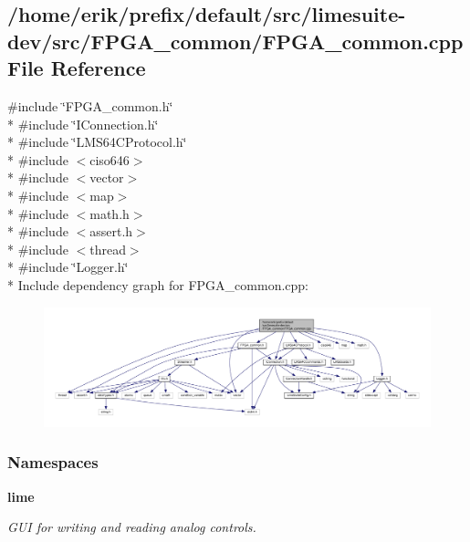 \subsection{/home/erik/prefix/default/src/limesuite-\/dev/src/\+F\+P\+G\+A\+\_\+common/\+F\+P\+G\+A\+\_\+common.cpp File Reference}
\label{FPGA__common_8cpp}
{\ttfamily \#include \char`\"{}F\+P\+G\+A\+\_\+common.\+h\char`\"{}}\\*
{\ttfamily \#include \char`\"{}I\+Connection.\+h\char`\"{}}\\*
{\ttfamily \#include \char`\"{}L\+M\+S64\+C\+Protocol.\+h\char`\"{}}\\*
{\ttfamily \#include $<$ciso646$>$}\\*
{\ttfamily \#include $<$vector$>$}\\*
{\ttfamily \#include $<$map$>$}\\*
{\ttfamily \#include $<$math.\+h$>$}\\*
{\ttfamily \#include $<$assert.\+h$>$}\\*
{\ttfamily \#include $<$thread$>$}\\*
{\ttfamily \#include \char`\"{}Logger.\+h\char`\"{}}\\*
Include dependency graph for F\+P\+G\+A\+\_\+common.\+cpp\+:
\nopagebreak
\begin{figure}[H]
\begin{center}
\leavevmode
\includegraphics[width=350pt]{da/d48/FPGA__common_8cpp__incl}
\end{center}
\end{figure}
\subsubsection*{Namespaces}
\begin{DoxyCompactItemize}
\item 
 {\bf lime}
\begin{DoxyCompactList}\small\item\em G\+UI for writing and reading analog controls. \end{DoxyCompactList}\end{DoxyCompactItemize}
